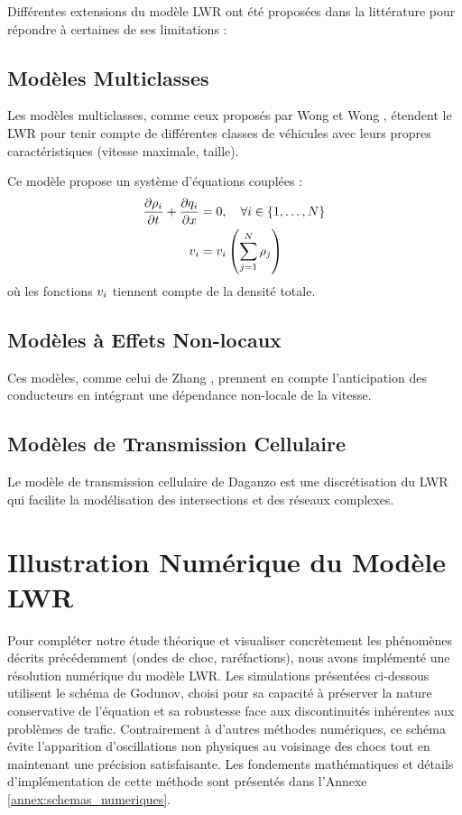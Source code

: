 Différentes extensions du modèle LWR ont été proposées dans la littérature pour répondre à certaines de ses limitations :

\subsection{Modèles Multiclasses}
\label{subsec:multiclasses}

Les modèles multiclasses, comme ceux proposés par Wong et Wong \cite{wong2002multi}, étendent le LWR pour tenir compte de différentes classes de véhicules avec leurs propres caractéristiques (vitesse maximale, taille).

\begin{example}
Ce modèle propose un système d'équations couplées :
\begin{align}
\frac{\partial \rho_{i}}{\partial t} + \frac{\partial q_{i}}{\partial x} &= 0, \quad \forall i \in \{1,\ldots,N\}\\
v_{i} &= v_{i}\left(\sum_{j=1}^{N} \rho_{j}\right)
\end{align}
où les fonctions $v_{i}$ tiennent compte de la densité totale.
\end{example}

\subsection{Modèles à Effets Non-locaux}
\label{subsec:non_local}

Ces modèles, comme celui de Zhang \cite{zhang2003non}, prennent en compte l'anticipation des conducteurs en intégrant une dépendance non-locale de la vitesse.

\subsection{Modèles de Transmission Cellulaire}
\label{subsec:cell_transmission}

Le modèle de transmission cellulaire de Daganzo \cite{daganzo1995cell} est une discrétisation du LWR qui facilite la modélisation des intersections et des réseaux complexes.

\section{Illustration Numérique du Modèle LWR}
\label{sec:illustration_numerique}

Pour compléter notre étude théorique et visualiser concrètement les phénomènes décrits précédemment (ondes de choc, raréfactions), nous avons implémenté une résolution numérique du modèle LWR. Les simulations présentées ci-dessous utilisent le schéma de Godunov, choisi pour sa capacité à préserver la nature conservative de l'équation et sa robustesse face aux discontinuités inhérentes aux problèmes de trafic. Contrairement à d'autres méthodes numériques, ce schéma évite l'apparition d'oscillations non physiques au voisinage des chocs tout en maintenant une précision satisfaisante. Les fondements mathématiques et détails d'implémentation de cette méthode sont présentés dans l'Annexe \ref{annex:schemas_numeriques}.

